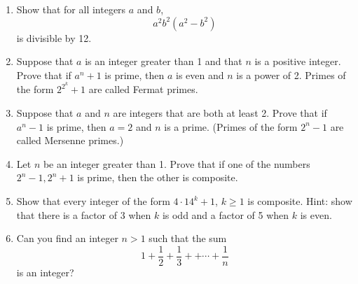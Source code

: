 \documentclass[12pt, reqno]{amsart}
\begin{document}
\begin{enumerate}
\item Show that for all integers $a$ and $b$, 
\[
a^2b^2(a^2 - b^2)
\]
is divisible by 12.


\item Suppose that $a$ is an integer greater than 1 and that $n$ is a positive integer. Prove that if $a^n +1$ is prime, then $a$ is even and $n$ is a power of 2. Primes of the form $2^{2^k} + 1$ are called Fermat primes.

\item Suppose that $a$ and $n$ are integers that are both at least 2.  Prove that if $a^n -1$ is prime, then $a = 2$ and $n$ is a prime. (Primes of the form $2^n - 1$ are called Mersenne primes.)

\item Let $n$ be an integer greater than 1. Prove that if one of the numbers $2^n - 1, 2^n + 1$ is prime, then the other is composite.

\item Show that every integer of the form $4\cdot 14^k+1$, $k\geq1$ is composite. Hint: show that there is a factor of 3 when $k$ is odd and a factor of 5 when $k$ is even.

\vspace{15pt}

\item Can you find an integer $n > 1$ such that the sum
$$1 + \frac{1}{2}+ \frac{1}{3}+ + \cdots + \frac{1}{n}$$
 is an integer?

\end{enumerate}
\end{document}
